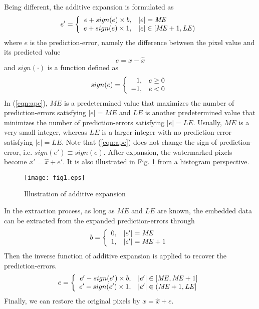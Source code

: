 \documentclass{article}
\begin{document}
Being different, the additive expansion is formulated as
\begin{equation}\label{eqn:ape}
 e' = \left\{ \begin{array}{r@{,\quad}l}
  e + sign(e) \times b & |e| = \mathit{ME} \\
  e + sign(e) \times 1 & |e| \in [\mathit{ME}+1,\mathit{LE}) \\
\end{array} \right. 
\end{equation}
where $e$ is the prediction-error, namely the difference between the pixel value and its predicted
value
\begin{equation}
 e = x - \hat{x} 
\end{equation}
and $sign(\cdot)$ is a function defined as
\begin{equation}
  sign(e) = \left\{ \begin{array}{r@{,\quad}l} 
    1 & e \ge 0 \\ -1 & e < 0 
  \end{array} \right.
\end{equation}
In (\ref{eqn:ape}), $\mathit{ME}$ is a predetermined value that maximizes the number of
prediction-errors satisfying $|e| = \mathit{ME}$ and $\mathit{LE}$ is another predetermined value
that minimizes the number of prediction-errors satisfying $|e|=\mathit{LE}$. Usually, $\mathit{ME}$
is a very small integer, whereas $\mathit{LE}$ is a larger integer with no prediction-error
satisfying $|e|=\mathit{LE}$. Note that (\ref{eqn:ape}) does not change the sign of
prediction-error, i.e. $sign(e') \equiv sign(e)$. After expansion, the watermarked pixels become $x' =
\hat{x} + e'$. It is also illustrated in Fig. \ref{fig:hist} from a histogram perspective.

\begin{figure}[t]
  \texttt{[image: fig1.eps]}
  \caption{\label{fig:hist}Illustration of additive expansion}
\end{figure}

In the extraction process, as long as $\mathit{ME}$ and $\mathit{LE}$ are known, the embedded data
can be extracted from the expanded prediction-errors through
\begin{equation}
 b = \left\{ \begin{array}{r@{,\quad}l}
  0 & |e'| = \mathit{ME} \\
  1 & |e'| = \mathit{ME} + 1 \\
\end{array} \right. 
\end{equation}
Then the inverse function of additive expansion is applied to recover the prediction-errors.
\begin{equation}
 e = \left\{ \begin{array}{r@{,\quad}l}
   e' - sign(e') \times b & |e'| \in [\mathit{ME}, \mathit{ME}+1] \\
  e' - sign(e') \times 1 & |e'| \in (\mathit{ME}+1, \mathit{LE}] \\
\end{array} \right. 
\end{equation}
Finally, we can restore the original pixels by
$x = \hat{x} + e$.
\end{document}
